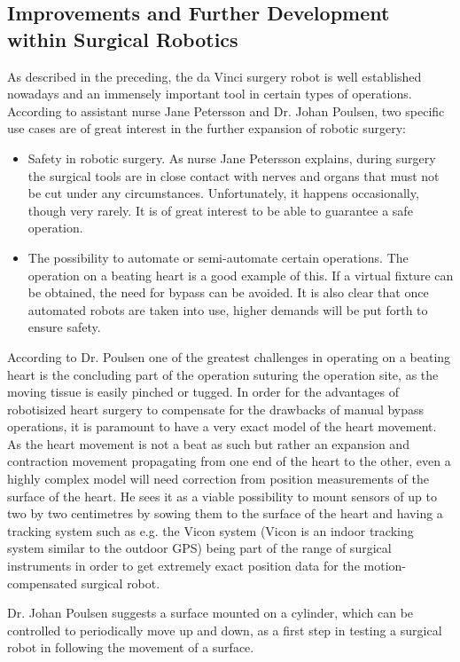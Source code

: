 \subsection*{Improvements and Further Development within Surgical Robotics}
As described in the preceding, the da Vinci surgery robot is  well established nowadays and an immensely important tool in  certain types of operations. According to assistant nurse Jane Petersson and Dr. Johan Poulsen, two specific use cases are of great interest in the further expansion of robotic surgery:
\begin{itemize}
\item Safety in robotic surgery. As  nurse Jane Petersson explains, during surgery the surgical tools are in close contact with nerves and organs that must not be cut under any circumstances. Unfortunately, it happens occasionally, though very rarely. It is of great interest to be able to guarantee a safe operation. 
\item The possibility to automate or semi-automate certain operations. The operation on a beating heart is a good example of this. If a virtual fixture can be obtained, the need for bypass can be avoided. It is also clear that once automated robots are taken into use, higher demands will be put forth to ensure safety.
\end{itemize}
According to Dr. Poulsen one of the greatest challenges in operating on a beating heart is the concluding part of the operation suturing the operation site, as the moving tissue is easily pinched or tugged. 
In order for the advantages of robotisized heart surgery to compensate for the drawbacks of manual bypass operations, it is paramount to have a very exact model of the heart movement. 
As the heart movement is not a beat as such but rather an expansion and contraction movement propagating from one end of the heart to the other, even a highly complex model will need correction from position measurements of the surface of the heart. 
He sees it as a viable possibility to mount sensors of up to two by two centimetres by sowing them to the surface of the heart and having a tracking system such as e.g. the Vicon system (Vicon is an indoor  tracking system similar to the outdoor GPS) being part of the range of surgical instruments in order to get extremely exact position data for the motion-compensated surgical robot.


Dr. Johan Poulsen suggests a surface mounted on a cylinder, which can be controlled to periodically move up and down, as a first step in testing a surgical robot in following the movement of a surface.





